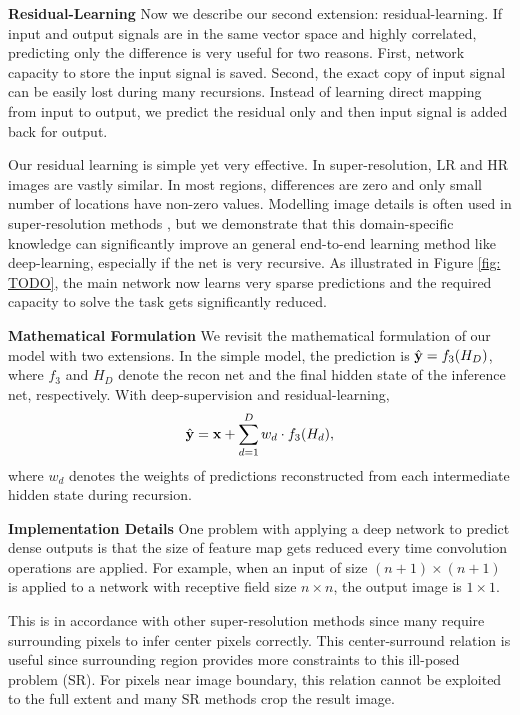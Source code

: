\documentclass[10pt,twocolumn,letterpaper]{article}
\begin{document}
\textbf{Residual-Learning} Now we describe our second extension: residual-learning. If input and output signals are in the same vector space and highly correlated, predicting only the difference is very useful for two reasons. First, network capacity to store the input signal is saved. Second, the exact copy of input signal can be easily lost during many recursions. Instead of learning direct mapping from input to output, we predict the residual only and then input signal is added back for output.

Our residual learning is simple yet very effective. In super-resolution, LR and HR images are vastly similar. In most regions, differences are zero and only small number of locations have non-zero values. Modelling image details is often used in super-resolution methods \cite{Timofte2013, Timofte, bevilacqua2012,bevilacqua2013super}, but we demonstrate that this domain-specific knowledge can significantly improve an general end-to-end learning method like deep-learning, especially if the net is very recursive.
As illustrated in Figure \ref{fig: TODO}, the main network now learns very sparse predictions and the required capacity to solve the task gets significantly reduced. 

\textbf{Mathematical Formulation} We revisit the mathematical formulation of our model with two extensions. In the simple model, the prediction is $\hat{{\bf y}} = f_3(H_D)$, where $f_3$ and $H_D$ denote the recon net and the final hidden state of the inference net, respectively. With deep-supervision and residual-learning,  
\begin{equation}
\hat{{\bf y}} = {\bf x} + \sum_{d=1}^{D} w_d \cdot f_3(H_d),
\end{equation}
where $w_d$ denotes the weights of predictions reconstructed from each intermediate hidden state during recursion.

\textbf{Implementation Details}
One problem with applying a deep network to predict dense outputs is that the size of feature map gets reduced every time convolution operations are applied. For example,  when an input of size $(n+1)\times (n+1)$ is applied to a network with receptive field size $n\times n$, the output image is $1\times1$. 

This is in accordance with other super-resolution methods since many require surrounding pixels to infer center pixels correctly. This center-surround relation is useful since surrounding region provides more constraints to this ill-posed problem (SR). For pixels near image boundary, this relation cannot be exploited to the full extent and many SR methods crop the result image. 
\end{document}
